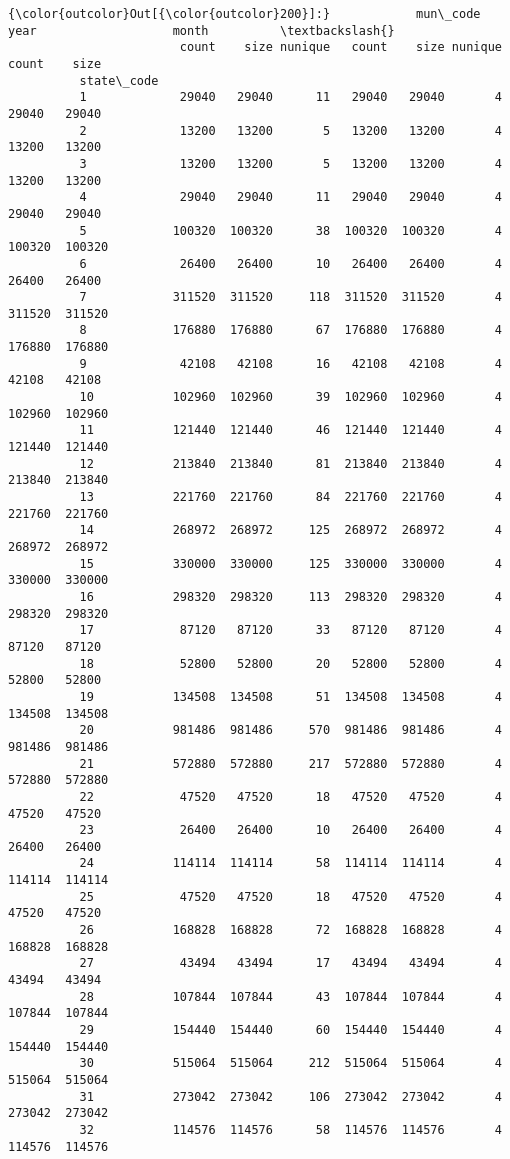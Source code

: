 \documentclass[11pt]{article}
\begin{document}
\begin{Verbatim}[commandchars=\\\{\}]
{\color{outcolor}Out[{\color{outcolor}200}]:}            mun\_code                    year                   month          \textbackslash{}
                        count    size nunique   count    size nunique   count    size   
          state\_code                                                                    
          1             29040   29040      11   29040   29040       4   29040   29040   
          2             13200   13200       5   13200   13200       4   13200   13200   
          3             13200   13200       5   13200   13200       4   13200   13200   
          4             29040   29040      11   29040   29040       4   29040   29040   
          5            100320  100320      38  100320  100320       4  100320  100320   
          6             26400   26400      10   26400   26400       4   26400   26400   
          7            311520  311520     118  311520  311520       4  311520  311520   
          8            176880  176880      67  176880  176880       4  176880  176880   
          9             42108   42108      16   42108   42108       4   42108   42108   
          10           102960  102960      39  102960  102960       4  102960  102960   
          11           121440  121440      46  121440  121440       4  121440  121440   
          12           213840  213840      81  213840  213840       4  213840  213840   
          13           221760  221760      84  221760  221760       4  221760  221760   
          14           268972  268972     125  268972  268972       4  268972  268972   
          15           330000  330000     125  330000  330000       4  330000  330000   
          16           298320  298320     113  298320  298320       4  298320  298320   
          17            87120   87120      33   87120   87120       4   87120   87120   
          18            52800   52800      20   52800   52800       4   52800   52800   
          19           134508  134508      51  134508  134508       4  134508  134508   
          20           981486  981486     570  981486  981486       4  981486  981486   
          21           572880  572880     217  572880  572880       4  572880  572880   
          22            47520   47520      18   47520   47520       4   47520   47520   
          23            26400   26400      10   26400   26400       4   26400   26400   
          24           114114  114114      58  114114  114114       4  114114  114114   
          25            47520   47520      18   47520   47520       4   47520   47520   
          26           168828  168828      72  168828  168828       4  168828  168828   
          27            43494   43494      17   43494   43494       4   43494   43494   
          28           107844  107844      43  107844  107844       4  107844  107844   
          29           154440  154440      60  154440  154440       4  154440  154440   
          30           515064  515064     212  515064  515064       4  515064  515064   
          31           273042  273042     106  273042  273042       4  273042  273042   
          32           114576  114576      58  114576  114576       4  114576  114576   
          

\end{Verbatim}
\end{document}
